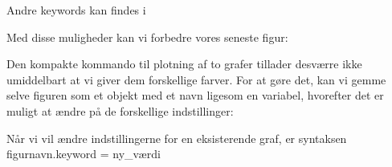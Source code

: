 \documentclass[letterpaper,10pt,english]{jupyterBook}
\begin{document}
Andre keywords kan findes i 

Med disse muligheder kan vi forbedre vores seneste figur:

\begin{sphinxVerbatim}[commandchars=\\\{\}]
     
        
        
        
       
\end{sphinxVerbatim}

\noindent{}

Den kompakte kommando til plotning af to grafer tillader desværre ikke umiddelbart at vi giver dem forskellige farver. For at gøre det, kan vi gemme selve figuren som et objekt med et navn ligesom en variabel, hvorefter det er muligt at ændre på de forskellige indstillinger:

\begin{sphinxVerbatim}[commandchars=\\\{\}]
      
\end{sphinxVerbatim}

\noindent{}

Når vi vil ændre indstillingerne for en eksisterende graf, er syntaksen figurnavn.keyword = ny\_værdi
\end{document}
